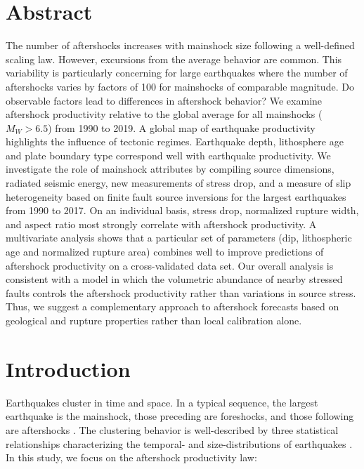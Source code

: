 \documentclass[draft, jgrga]{agujournal2018}
\begin{document}
\justify

\section*{Abstract}

The number of aftershocks increases with mainshock size following a well-defined scaling law. However, excursions from the average behavior are common. This variability is particularly concerning for large earthquakes where the number of aftershocks varies by factors of 100 for mainshocks of comparable magnitude. Do observable factors lead to differences in aftershock behavior? We examine aftershock productivity relative to the global average for all mainshocks ($M_W>6.5$) from 1990 to 2019. A global map of earthquake productivity highlights the influence of tectonic regimes. Earthquake depth, lithosphere age and plate boundary type correspond well with earthquake productivity. We investigate the role of mainshock attributes by compiling source dimensions, radiated seismic energy, new measurements of stress drop, and a measure of slip heterogeneity based on finite fault source inversions for the largest earthquakes from 1990 to 2017. On an individual basis, stress drop, normalized rupture width, and aspect ratio most strongly correlate with aftershock productivity. A multivariate analysis shows that a particular set of parameters (dip, lithospheric age and normalized rupture area) combines well to improve predictions of aftershock productivity on a cross-validated data set. Our overall analysis is consistent with a model in which the volumetric abundance of nearby stressed faults controls the aftershock productivity rather than variations in source stress. Thus, we suggest a complementary approach to aftershock forecasts based on geological and rupture properties rather than local calibration alone.  

\section{Introduction}

Earthquakes cluster in time and space. In a typical sequence, the largest earthquake is the mainshock, those preceding are foreshocks, and those following are aftershocks \citep{Omori1895}. The clustering behavior is well-described by three statistical relationships characterizing the temporal- and size-distributions of earthquakes \citep[e.g.,][]{Ogata1988}. In this study, we focus on the aftershock productivity law:
\end{document}
